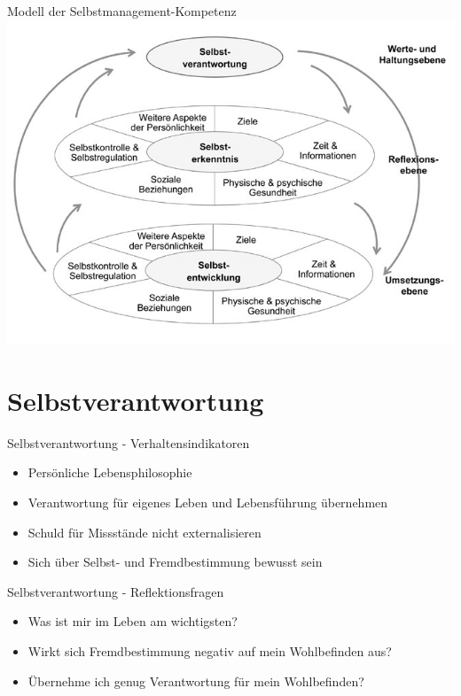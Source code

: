 
\begin{frame}[c]{Modell der Selbstmanagement-Kompetenz}
    \includegraphics[width=\textwidth]{zsm/modell.jpeg}
\end{frame}


\section{Selbstverantwortung}

\begin{frame}[c]{Selbstverantwortung - Verhaltensindikatoren}
    \begin{itemize}
    \item Persönliche Lebensphilosophie
    \pause
    \item Verantwortung für eigenes Leben und Lebensführung übernehmen
    \pause
    \item Schuld für Missstände nicht externalisieren
    \pause
    \item Sich über Selbst- und Fremdbestimmung bewusst sein
    \end{itemize}
\end{frame}


\begin{frame}[c]{Selbstverantwortung - Reflektionsfragen}
    \begin{itemize}
    \item Was ist mir im Leben am wichtigsten? \newline
    \pause
    \item Wirkt sich Fremdbestimmung negativ auf mein Wohlbefinden aus? \newline
    \pause
    \item Übernehme ich genug Verantwortung für mein Wohlbefinden?
    \end{itemize}
\end{frame}


